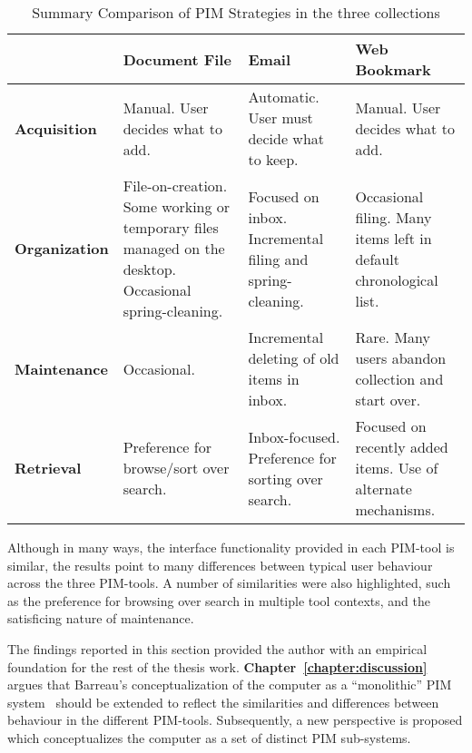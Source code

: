 \begin{table}[hbtp]
\begin{center}
\begin{footnotesize}
\begin{tabular}{|p{2.5cm}|p{3.5cm}|p{3.5cm}|p{3.5cm}|}
\hline
    {\bf } & {\bf Document File} & {\bf Email} & {\bf Web Bookmark} \\
\hline
{\bf Acquisition} & Manual. User decides what to add. & Automatic. User must decide what to keep. & Manual. User decides what to add. \\
\hline
{\bf Organization} & File-on-creation. Some working or temporary files managed on the desktop. Occasional spring-cleaning. & Focused on inbox. Incremental filing and spring-cleaning. & Occasional filing. Many items left in default chronological list. \\
\hline
{\bf Maintenance} & Occasional. & Incremental deleting of old items in inbox. & Rare. Many users abandon collection and start over. \\
\hline
{\bf Retrieval} & Preference for browse/sort over search. & Inbox-focused. Preference for sorting over search. & Focused on recently added items. Use of alternate mechanisms. \\
\hline
\end{tabular}  
\end{footnotesize}
\caption{Summary Comparison of PIM Strategies in the three collections}
\label{table:chapter3_overview_strategy}
\end{center}
\end{table}

Although in many ways, the interface functionality provided in each PIM-tool is similar, the results point to many differences between typical user behaviour across the three PIM-tools.  A number of similarities were also highlighted, such as the preference for browsing over search in multiple tool contexts, and the satisficing nature of maintenance.

The findings reported in this section provided the author with an empirical foundation for the rest of the thesis work.  \textbf{Chapter~\ref{chapter:discussion}} argues that Barreau's conceptualization of the computer as a ``monolithic'' PIM system~\citep{barreau:95} should be extended to reflect the similarities and differences between behaviour in the different PIM-tools. Subsequently, a new perspective is proposed which conceptualizes the computer as a set of distinct PIM sub-systems.










